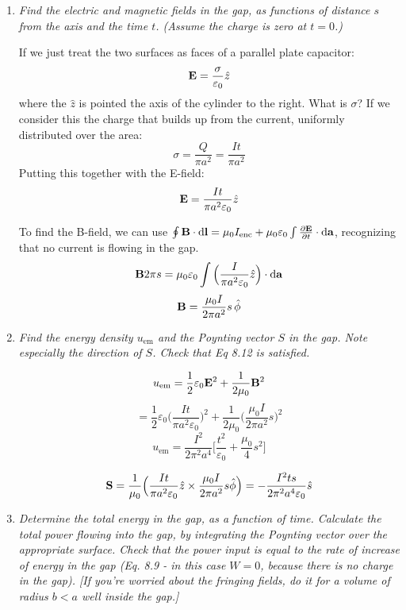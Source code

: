 \documentclass[12pt]{article}
\begin{document}
\begin{enumerate}[label=\alph*)]
\item \emph{Find the electric and magnetic fields in the gap, as functions of distance $s$ from the axis and the time $t$. (Assume the charge is zero at $t=0$.)}\bigskip

If we just treat the two surfaces as faces of a parallel plate capacitor:
\[\vb{E}=\frac{\sigma}{\varepsilon_0}\hat{z}\]
where the $\hat{z}$ is pointed the axis of the cylinder to the right. What is $\sigma$? If we consider this the charge that builds up from the current, uniformly distributed over the area:
\[\sigma = \frac{Q}{\pi a^2} = \frac{It}{\pi a^2}\]
Putting this together with the E-field:
\[\vb{E} = \frac{It}{\pi a^2 \varepsilon_0}\hat{z}\]

To find the B-field, we can use $\oint \vb{B} \cdot \dd{\vb{l}} = \mu_0 I_\text{enc} + \mu_0 \varepsilon_0 \int \pdv{\vb{E}}{t}\cdot \dd{\vb{a}}$, recognizing that no current is flowing in the gap.
\[\vb{B}2\pi s = \mu_0 \varepsilon_0 \int \Big(\frac{I}{\pi a^2 \varepsilon_0}\hat{z}\Big)\cdot \dd{\vb{a}}\]
\[\vb{B} = \frac{\mu_0 I}{2 \pi a^2} s \, \hat{\phi}\]

\item \emph{Find the energy density $u_\text{em}$ and the Poynting vector $S$ in the gap. Note especially the direction of $S$. Check that Eq 8.12 is satisfied.}\bigskip

\[u_\text{em} = \frac{1}{2} \varepsilon_0 \vb{E}^2 + \frac{1}{2\mu_0} \vb{B}^2\]
\[= \frac{1}{2} \varepsilon_0 \Big( \frac{It}{\pi a^2 \varepsilon_0} \Big)^2 + \frac{1}{2 \mu_0}\Big( \frac{\mu_0 I}{2 \pi a^2}s\Big)^2\]
\[u_\text{em} = \frac{I^2}{2\pi^2 a^4}\Big[ \frac{t^2}{\varepsilon_0} + \frac{\mu_0}{4}s^2\Big]\]

\[\vb{S} = \frac{1}{\mu_0}\Big(\frac{It}{\pi a^2 \varepsilon_0} \hat{z} \times \frac{\mu_0 I}{2 \pi a^2}s \hat{\phi} \Big) =  -\frac{I^2 t s}{2 \pi^2 a^4 \varepsilon_0}\hat{s}\]



\item \emph{Determine the total energy in the gap, as a function of time. Calculate the total power flowing into the gap, by integrating the Poynting vector over the appropriate surface. Check that the power input is equal to the rate of increase of energy in the gap (Eq. 8.9 - in this case $W=0$, because there is no charge in the gap). [If you're worried about the fringing fields, do it for a volume of radius $b<a$ well inside the gap.]}\bigskip
\end{enumerate}
\end{document}
